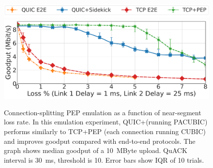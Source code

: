 \begin{figure}[t]
\centering
\includegraphics[width=\columnwidth]{figures/fig6_legend.pdf}
\includegraphics[width=\columnwidth]{figures/fig6_loss_bw100_10M_delay_25ms_1ms.pdf}
\vspace{-0.4cm}
\caption{Connection-splitting PEP emulation as a function of near-segment
	loss rate. In this emulation experiment, QUIC+\Sys (running PACUBIC)
  performs similarly to TCP+PEP (each connection running CUBIC)
  and improves goodput compared with end-to-end protocols. The graph shows
  median goodput of a 10~MByte upload. QuACK interval is 30~ms, threshold
is 10. Error bars show IQR of 10 trials.
\vspace{-1cm}
}
\label{fig:loss-vs-tput}
\end{figure}

%

